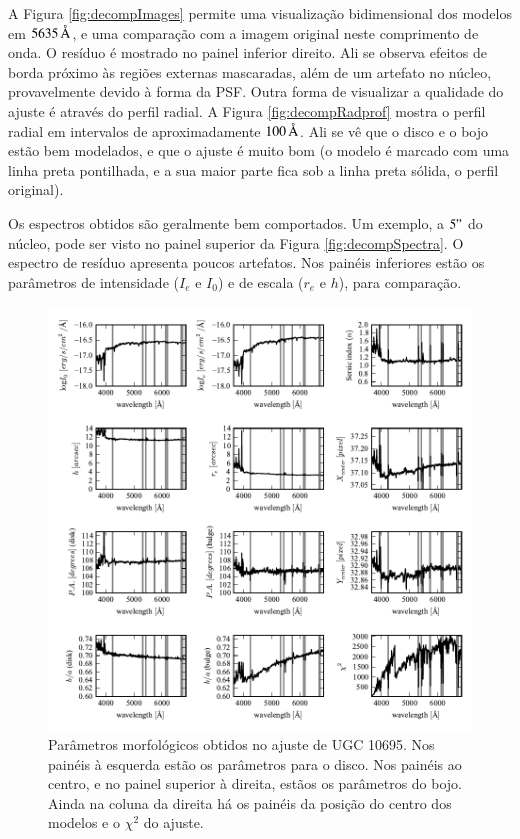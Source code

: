 A Figura \ref{fig:decompImages} permite uma visualização bidimensional dos
modelos em $5635\,\text{\normalfont\AA}$, e uma comparação com a imagem original neste
comprimento de onda. O resíduo é mostrado no painel inferior direito. Ali se
observa efeitos de borda próximo às regiões externas mascaradas, além de um
artefato no núcleo, provavelmente devido à forma da PSF. Outra forma de
visualizar a qualidade do ajuste é através do perfil radial. A Figura
\ref{fig:decompRadprof} mostra o perfil radial em intervalos de aproximadamente
$100\,\text{\normalfont\AA}$. Ali se vê que o disco e o bojo estão bem modelados, e que o
ajuste é muito bom (o modelo é marcado com uma linha preta pontilhada, e a sua
maior parte fica sob a linha preta sólida, o perfil original).

Os espectros obtidos são geralmente bem comportados. Um exemplo, a $5"$ do
núcleo, pode ser visto no painel superior da Figura \ref{fig:decompSpectra}.
O espectro de resíduo apresenta poucos artefatos. Nos painéis inferiores estão
os parâmetros de intensidade ($I_e$ e $I_0$) e de escala ($r_e$ e $h$), para
comparação.

\begin{figure}
	\includegraphics{figuras/decomp-fit-parameters}
	\caption[Parâmetros morfológicos] {Parâmetros morfológicos obtidos no ajuste
	de UGC 10695. Nos painéis à esquerda estão os parâmetros para o disco. Nos
	painéis ao centro, e no painel superior à direita, estãos os parâmetros do
	bojo. Ainda na coluna da direita há os painéis da posição do centro dos
	modelos e o $\chi^2$ do ajuste.}
	\label{fig:decompParams}
\end{figure}

